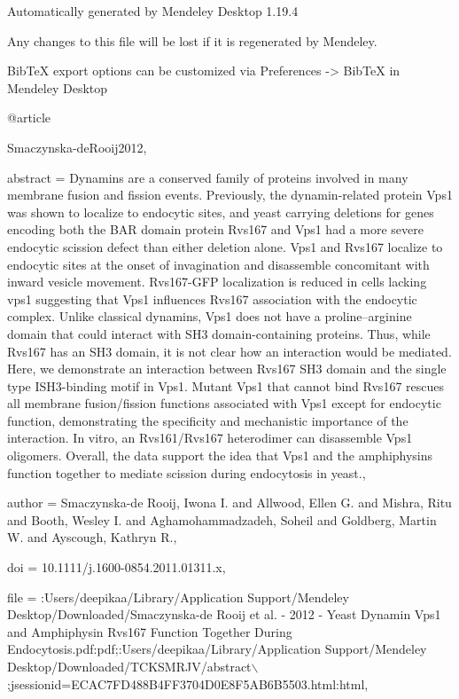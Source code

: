 Automatically generated by Mendeley Desktop 1.19.4

Any changes to this file will be lost if it is regenerated by Mendeley.



BibTeX export options can be customized via Preferences -> BibTeX in Mendeley Desktop



@article{Smaczynska-deRooij2012,

abstract = {Dynamins are a conserved family of proteins involved in many membrane fusion and fission events. Previously, the dynamin-related protein Vps1 was shown to localize to endocytic sites, and yeast carrying deletions for genes encoding both the BAR domain protein Rvs167 and Vps1 had a more severe endocytic scission defect than either deletion alone. Vps1 and Rvs167 localize to endocytic sites at the onset of invagination and disassemble concomitant with inward vesicle movement. Rvs167-GFP localization is reduced in cells lacking vps1 suggesting that Vps1 influences Rvs167 association with the endocytic complex. Unlike classical dynamins, Vps1 does not have a proline–arginine domain that could interact with SH3 domain-containing proteins. Thus, while Rvs167 has an SH3 domain, it is not clear how an interaction would be mediated. Here, we demonstrate an interaction between Rvs167 SH3 domain and the single type ISH3-binding motif in Vps1. Mutant Vps1 that cannot bind Rvs167 rescues all membrane fusion/fission functions associated with Vps1 except for endocytic function, demonstrating the specificity and mechanistic importance of the interaction. In vitro, an Rvs161/Rvs167 heterodimer can disassemble Vps1 oligomers. Overall, the data support the idea that Vps1 and the amphiphysins function together to mediate scission during endocytosis in yeast.},

author = {{Smaczynska-de Rooij}, Iwona I. and Allwood, Ellen G. and Mishra, Ritu and Booth, Wesley I. and Aghamohammadzadeh, Soheil and Goldberg, Martin W. and Ayscough, Kathryn R.},

doi = {10.1111/j.1600-0854.2011.01311.x},

file = {:Users/deepikaa/Library/Application Support/Mendeley Desktop/Downloaded/Smaczynska-de Rooij et al. - 2012 - Yeast Dynamin Vps1 and Amphiphysin Rvs167 Function Together During Endocytosis.pdf:pdf;:Users/deepikaa/Library/Application Support/Mendeley Desktop/Downloaded/TCKSMRJV/abstract$\backslash$;jsessionid=ECAC7FD488B4FF3704D0E8F5AB6B5503.html:html},

}
